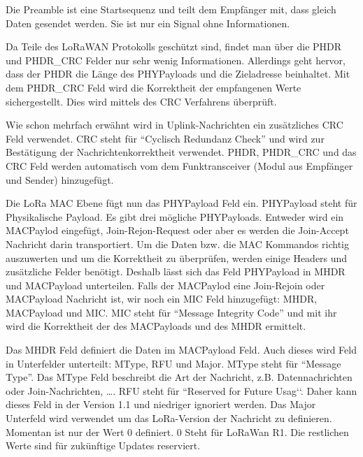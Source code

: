 \documentclass[a4paper, 12pt]{article}
\begin{document}
                Die Preamble ist eine Startsequenz und teilt dem Empfänger mit, dass gleich Daten gesendet werden. 
                Sie ist nur ein Signal ohne Informationen.

                Da Teile des LoRaWAN Protokolls geschützt sind, findet man über die PHDR und PHDR\_CRC Felder nur sehr wenig 
                Informationen. Allerdings geht hervor, dass der PHDR die Länge des PHYPayloads und die Zieladresse 
                beinhaltet.
                Mit dem PHDR\_CRC Feld wird die Korrektheit der empfangenen Werte sichergestellt. Dies wird  
                mittels des CRC Verfahrens überprüft.
                
                Wie schon mehrfach erwähnt wird in Uplink-Nachrichten ein zusätzliches CRC Feld verwendet. CRC steht für 
                ``Cyclisch Redundanz Check'' und wird zur Bestätigung der Nachrichtenkorrektheit verwendet. 
                PHDR, PHDR\_CRC 
                und das CRC Feld werden automatisch vom dem Funktransceiver (Modul aus Empfänger und Sender) hinzugefügt.

                Die LoRa MAC Ebene fügt nun das PHYPayload Feld ein. PHYPayload steht für Physikalische Payload. 
                Es gibt drei mögliche PHYPayloads. Entweder wird ein MACPaylod eingefügt, Join-Rejon-Request oder aber 
                es werden die Join-Accept Nachricht darin transportiert. Um die Daten bzw. die MAC Kommandos richtig auszuwerten 
                und um die Korrektheit zu überprüfen, werden einige Headers und zusätzliche Felder benötigt. 
                Deshalb lässt sich das Feld PHYPayload in MHDR und MACPayload unterteilen. Falls der 
                MACPaylod eine Join-Rejoin oder MACPayload Nachricht ist, wir noch ein MIC 
                Feld hinzugefügt: MHDR, MACPayload und MIC. MIC steht für ``Message Integrity Code'' und mit ihr wird 
                die Korrektheit der des MACPayloads und des MHDR ermittelt.

                Das MHDR Feld definiert die Daten im MACPayload Feld. Auch dieses wird Feld in 
                Unterfelder unterteilt: MType, RFU und Major. MType steht für ``Message Type''. Das MType Feld beschreibt die Art der 
                Nachricht, z.B. Datennachrichten oder Join-Nachrichten, \dots. 
                RFU steht für ``Reserved for Future Usag‘‘. Daher kann 
                dieses Feld in der Version 1.1 und niedriger ignoriert werden. Das Major Unterfeld wird verwendet um das 
                LoRa-Version der Nachricht zu definieren. Momentan ist nur der Wert 0 definiert. 0 Steht für LoRaWan R1. 
                Die restlichen Werte sind für zukünftige Updates reserviert.
\end{document}
